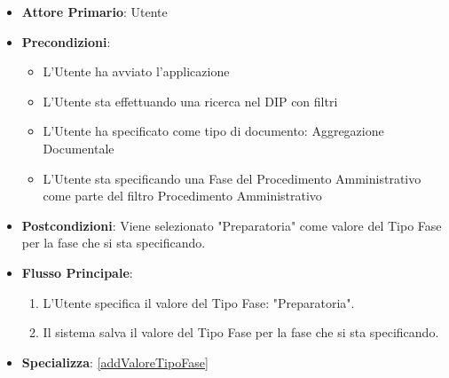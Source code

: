 \begin{itemize}
      \item \textbf{Attore Primario}: Utente
      \item \textbf{Precondizioni}: 
      \begin{itemize}
            \item L'Utente ha avviato l'applicazione
            \item L'Utente sta effettuando una ricerca nel DIP con filtri
            \item L'Utente ha specificato come tipo di documento: Aggregazione Documentale
            \item L'Utente sta specificando una Fase del Procedimento Amministrativo come parte del filtro Procedimento Amministrativo
      \end{itemize}
      \item \textbf{Postcondizioni}: Viene selezionato "Preparatoria" come valore del Tipo Fase per la fase che si sta specificando.
      \item \textbf{Flusso Principale}:
      \begin{enumerate}
            \item L'Utente specifica il valore del Tipo Fase: "Preparatoria".
            \item Il sistema salva il valore del Tipo Fase per la fase che si sta specificando.
      \end{enumerate}
      \item \textbf{Specializza}: \ref{addValoreTipoFase}
\end{itemize}

